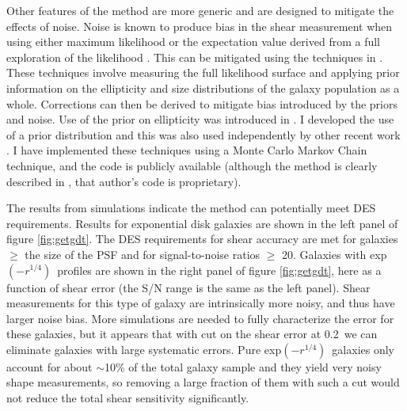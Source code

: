 \documentclass[12pt]{article}
\newcommand{\devprof}{exp$(-r^{1/4})$}
\newcommand{\errcut}{0.2}
\begin{document}
Other features of the method are more generic and are designed to mitigate the
effects of noise.  Noise is known to produce bias in the shear measurement when
using either maximum likelihood \cite{Refreg12} or the expectation value
derived from a full exploration of the likelihood \cite{Miller12}.  This can be
mitigated using the techniques in \cite{Miller07,Miller12}. These techniques
involve measuring the full likelihood surface and applying prior information on
the ellipticity and size distributions of the galaxy population as a whole.
Corrections can then be derived to mitigate bias introduced by the priors and
noise.  Use of the prior on ellipticity was introduced in \cite{Miller07}. I
developed the use of a prior distribution and this was also used independently
by other recent work \cite{Miller12}.  I have implemented these techniques
using a Monte Carlo Markov Chain technique, and the code is publicly available
(although the method is clearly described in \cite{Miller07}, that author's
code is proprietary).

The results from simulations indicate the method can potentially meet DES
requirements.  Results for exponential disk galaxies are shown in the left
panel of figure \ref{fig:getgdt}.  The DES requirements for shear accuracy are
met for galaxies $\geq$ the size of the PSF and for signal-to-noise ratios
$\geq$ 20.  Galaxies with \devprof\ profiles are shown in the right panel of
figure \ref{fig:getgdt}, here as a function of shear error (the S/N range is
the same as the left panel).  Shear measurements for this type of galaxy are
intrinsically more noisy, and thus have larger noise bias.  More simulations
are needed to fully characterize the error for these galaxies, but it appears
that with cut on the shear error at \errcut\ we can eliminate
galaxies with large systematic errors.  Pure \devprof\ galaxies only account
for about $\sim$10\% of the total galaxy sample and they yield very noisy shape
measurements, so removing a large fraction of them with such a cut would not
reduce the total shear sensitivity significantly.
\end{document}
